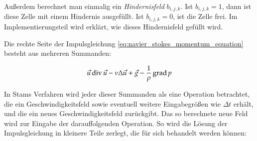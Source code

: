 Außerdem berechnet man einmalig ein \emph{Hindernisfeld}
$b_{i,j,k}$. Ist $b_{i,j,k} = 1$, dann ist diese Zelle mit einem
Hindernis ausgefüllt. Ist $b_{i,j,k} = 0$, ist die Zelle frei. Im
Implementierungsteil wird erklärt, wie dieses Hindernisfeld gefüllt
wird.

Die rechte Seite der Impulsgleichung \ref{eq:navier_stokes_momentum_equation} besteht
aus mehreren Summanden:

\begin{equation}
\vec{u} \operatorname*{div} \vec{u} -
\nu \Delta \vec{u} +
\vec{g} -
\frac{
	1
}
{
	\rho
}
\operatorname*{grad} p
\end{equation}

In Stams Verfahren wird jeder dieser Summanden als eine Operation betrachtet,
die ein Geschwindigkeitsfeld sowie eventuell weitere Eingabegrößen wie $\Delta
t$ erhält, und die ein neues Geschwindigkeitsfeld zurückgibt. Das so berechnete
neue Feld wird zur Eingabe der darauffolgenden Operation. So wird die Lösung der
Impulsgleichung in kleinere Teile zerlegt, die für sich behandelt werden können:

